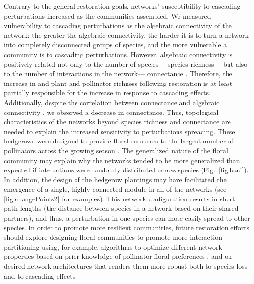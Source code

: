 \documentclass[12pt]{article}
\begin{document}
Contrary to the general restoration goals, networks' susceptibility 
 to cascading perturbations increased as the communities assembled. We measured vulnerability to cascading perturbations as the algebraic connectivity of the network: the greater the algebraic connectivity, the harder it  is to turn a network into completely disconnected groups of species, and the more vulnerable a community is to cascading perturbations. However, algebraic connectivity is positively related not only to the number of species--- species richness--- but also to the number of interactions in the network--- connectance \citep{gibert2013spatial}. Therefore, the increase in and plant and pollinator richness following
restoration is at least partially responsible for the increase in
response to cascading effects. Additionally, despite the correlation between connectance and algebraic connectivity \citep{gibert2013spatial}, we
observed a decrease in connectance. Thus, topological characteristics of the
networks beyond species richness and connectance are needed to explain
the increased sensitivity to perturbations spreading. These hedgerows
were designed to provide floral resources to the largest number of
pollinators across the growing season \citep{menz-2010-4}. The
generalized nature of the floral community may explain why the
networks tended to be more generalized than expected if interactions
were randomly distributed across species (Fig.~\ref{fig:baci}). In
addition, the design of the hedgerow plantings may have facilitated
the emergence of a single, highly connected module in all of the
networks (see \ref{fig:changePoints2} for examples). This network
configuration results in short path lengths (the distance between
species in a network based on their shared partners), and thus, a
perturbation in one species can more easily spread to other
species. In order to promote more resilient communities, future
restoration efforts should explore designing floral communities to
promote more interaction partitioning using, for example, algorithms
to optimize different network properties based on prior knowledge of
pollinator floral preferences \citep{mgonigle2016tool}, and on desired
network architectures that renders them more robust both to species
loss and to cascading effects.


\end{document}
